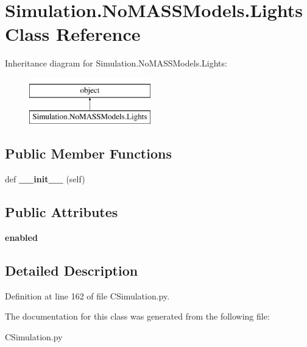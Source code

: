 \hypertarget{class_c_simulation_1_1_simulation_1_1_no_m_a_s_s_models_1_1_lights}{}\section{Simulation.\+No\+M\+A\+S\+S\+Models.\+Lights Class Reference}
\label{class_c_simulation_1_1_simulation_1_1_no_m_a_s_s_models_1_1_lights}
Inheritance diagram for Simulation.\+No\+M\+A\+S\+S\+Models.\+Lights\+:\begin{figure}[H]
\begin{center}
\leavevmode
\includegraphics[height=2.000000cm]{class_c_simulation_1_1_simulation_1_1_no_m_a_s_s_models_1_1_lights}
\end{center}
\end{figure}
\subsection*{Public Member Functions}
\begin{DoxyCompactItemize}
\item 
\mbox{\label{class_c_simulation_1_1_simulation_1_1_no_m_a_s_s_models_1_1_lights_ae64f0875afe3067b97ba370b354b9213}} 
def {\bfseries \+\_\+\+\_\+init\+\_\+\+\_\+} (self)
\end{DoxyCompactItemize}
\subsection*{Public Attributes}
\begin{DoxyCompactItemize}
\item 
\mbox{\label{class_c_simulation_1_1_simulation_1_1_no_m_a_s_s_models_1_1_lights_a91b39549c797bd5646357c8b6eecad0f}} 
{\bfseries enabled}
\end{DoxyCompactItemize}


\subsection{Detailed Description}


Definition at line 162 of file C\+Simulation.\+py.



The documentation for this class was generated from the following file\+:\begin{DoxyCompactItemize}
\item 
C\+Simulation.\+py\end{DoxyCompactItemize}
